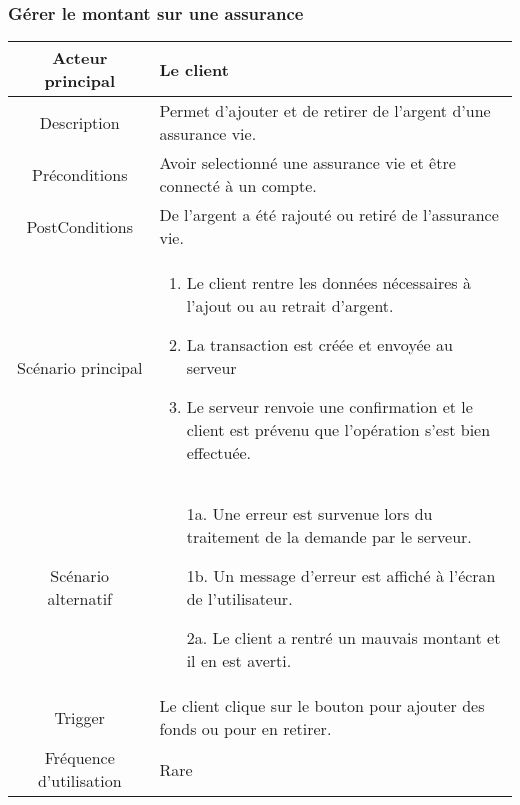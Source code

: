 \documentclass{article}
\begin{document}
\subsubsection{Gérer le montant sur une assurance}
\begin{table}[h]
    \begin{tabular}{|c|p{10cm}|}
       \hline
       Acteur principal&Le client\\
       \hline
       Description&Permet d'ajouter et de retirer de l'argent d'une assurance vie.\\
       \hline
       Préconditions&Avoir selectionné une assurance vie et être connecté à un compte.\\
       \hline
       PostConditions&De l'argent a été rajouté ou retiré de l'assurance vie.\\
       \hline
       Scénario principal& 
             \begin{enumerate}
                \item Le client rentre les données nécessaires à l'ajout ou au retrait d'argent.
                \item La transaction est créée et envoyée au serveur
                \item Le serveur renvoie une confirmation et le client est prévenu que l'opération s'est bien effectuée.
             \end{enumerate}     \\
       \hline
       Scénario alternatif&            
       \begin{itemize}
        \item[1a.] Une erreur est survenue lors du traitement de la demande par le serveur.
        \item[1b.] Un message d'erreur est affiché à l'écran de l'utilisateur. 
        \item[2a.] Le client a rentré un mauvais montant et il en est averti.
    \end{itemize}\\
       \hline
       Trigger&Le client clique sur le bouton pour ajouter des fonds ou pour en retirer.\\
       \hline
       Fréquence d'utilisation&Rare\\
       \hline
    \end{tabular}
 \end{table}

\newpage

\end{document}
